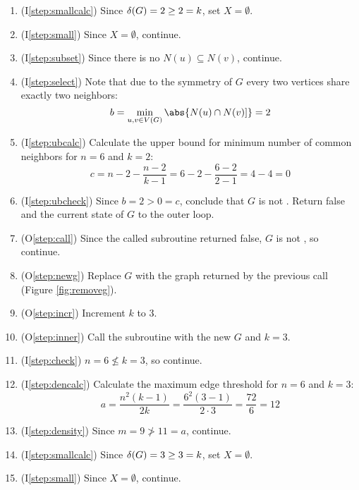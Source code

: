 \begin{enumerate}
\item (I\ref{step:smallcalc}) Since \(\delta(G)=2\ge2=k\), set \(X=\emptyset\).

\item (I\ref{step:small}) Since \(X=\emptyset\), continue.

\item (I\ref{step:subset}) Since there is no \(N(u)\subseteq N(v)\), continue.

\item (I\ref{step:select}) Note that due to the symmetry of \(G\) every two vertices share exactly two neighbors:
  \[b=\min_{u,v\in V(G)}\abs{N(u)\cap N(v)]}=2\]

\item (I\ref{step:ubcalc}) Calculate the upper bound for minimum number of common neighbors for \(n=6\) and
  \(k=2\):
  \[c=n-2-\frac{n-2}{k-1}=6-2-\frac{6-2}{2-1}=4-4=0\]

\item (I\ref{step:ubcheck}) Since \(b=2>0=c\), conclude that \(G\) is not .  Return false and the current
  state of \(G\) to the outer loop.

\item (O\ref{step:call}) Since the called subroutine returned false, \(G\) is not , so continue.

\item (O\ref{step:newg}) Replace \(G\) with the graph returned by the previous call (Figure \ref{fig:removeg}).

\item (O\ref{step:incr}) Increment \(k\) to 3.

\item (O\ref{step:inner}) Call the subroutine with the new \(G\) and \(k=3\).
  
\item (I\ref{step:check}) \(n=6\nleq k=3\), so continue.

\item (I\ref{step:dencalc}) Calculate the maximum edge threshold for \(n=6\) and \(k=3\):
  \[a=\frac{n^2(k-1)}{2k}=\frac{6^2(3-1)}{2\cdot3}=\frac{72}{6}=12\]

\item (I\ref{step:density}) Since \(m=9\ngtr11=a\), continue.

\item (I\ref{step:smallcalc}) Since \(\delta(G)=3\ge3=k\), set \(X=\emptyset\).

\item (I\ref{step:small}) Since \(X=\emptyset\), continue.


\end{enumerate}
